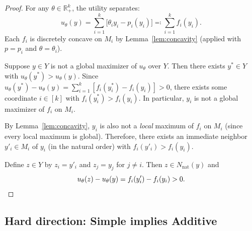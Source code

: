 \documentclass[11pt]{article}
\newcommand{\R}{\mathbb{R}}
\newcommand{\Rp}{\R_+}
\begin{document}
\begin{proof}
For any $\theta \in \Rp^k$, the utility separates:
\[
  u_\theta(y) = \sum_{i=1}^k \bigl[\theta_i y_i - p_i(y_i)\bigr]
  \eqqcolon \sum_{i=1}^k f_i(y_i).
\]
Each $f_i$ is discretely concave on $M_i$ by Lemma~\ref{lem:concavity}
(applied with $p = p_i$ and $\theta = \theta_i$).

Suppose $y \in Y$ is not a global maximizer of $u_\theta$ over $Y$.
Then there exists $y^* \in Y$ with $u_\theta(y^*) > u_\theta(y)$.
Since $u_\theta(y^*) - u_\theta(y) = \sum_{i=1}^k [f_i(y^*_i) - f_i(y_i)] > 0$,
there exists some coordinate $i \in [k]$ with $f_i(y^*_i) > f_i(y_i)$.
In particular, $y_i$ is not a global maximizer of $f_i$ on $M_i$.

By Lemma~\ref{lem:concavity}, $y_i$ is also not a \emph{local} maximum of $f_i$
on $M_i$ (since every local maximum is global).
Therefore, there exists an immediate neighbor $y'_i \in M_i$ of $y_i$
(in the natural order) with $f_i(y'_i) > f_i(y_i)$.

Define $z \in Y$ by $z_i = y'_i$ and $z_j = y_j$ for $j \neq i$.
Then $z \in N_{\mathrm{nat}}(y)$ and
\[
  u_\theta(z) - u_\theta(y) = f_i(y'_i) - f_i(y_i) > 0. \qedhere
\]
\end{proof}

\subsection{Hard direction: Simple implies Additive}\label{sec:hard}
\end{document}
